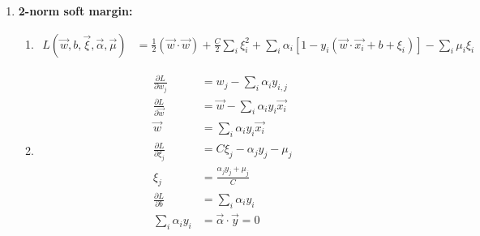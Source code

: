 \documentclass[12pt]{article}
\begin{document}
\begin{enumerate}
\item \textbf{2-norm soft margin: }
\begin{enumerate}
\item %
\begin{align*}
L(\vec{w}, b, \vec{\xi},\vec{\alpha},\vec{\mu}) &= \frac{1}{2}\left(\vec{w} \cdot \vec{w}\right) + \frac{C}{2}\sum_i \xi_i^2 + \sum_i \alpha_i \left[ 1 - y_i \left( \vec{w}\cdot \vec{x_i}+b+\xi_i  \right) \right] - \sum_i \mu_i \xi_i
\end{align*}

\item %
\begin{align*}
\frac{\partial L}{\partial w_j} &= w_j - \sum_i \alpha_i y_{i,j}\\
\frac{\partial L}{\partial \vec{w}} &= \vec{w} - \sum_i \alpha_i y_i \vec{x_i} \\
\vec{w} &= \sum_i \alpha_i y_i \vec{x_i} \\
\frac{\partial L }{\partial \xi_j} &= C\xi_j - \alpha_jy_j - \mu_j\\
\xi_j &= \frac{\alpha_j y_j + \mu_j}{C} \\
\frac{\partial L}{\partial b} &= \sum_i \alpha_i y_i \\
\sum_i \alpha_i y_i &= \vec{\alpha} \cdot \vec{y} = 0
\end{align*}


\end{enumerate}
\end{enumerate}
\end{document}
